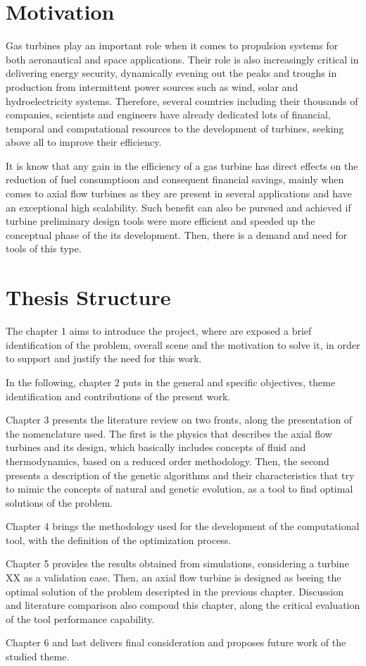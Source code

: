 \section{Motivation}
Gas turbines play an important role when it comes to propulsion systems for both aeronautical and space applications. Their role is also increasingly critical in delivering energy security, dynamically evening out the peaks and troughs in production from intermittent power sources such as wind, solar and hydroelectricity systems. Therefore, several countries including their thousands of companies, scientists and engineers have already dedicated lots of financial, temporal and computational resources to the development of turbines, seeking above all to improve their efficiency.

It is know that any gain in the efficiency of a gas turbine has direct effects on the reduction of fuel consumptioon and consequent financial savings, mainly when comes to axial flow turbines as they are present in several applications and have an exceptional high scalability. Such benefit can also be pursued and achieved if turbine preliminary design tools were more efficient and speeded up the conceptual phase of the its development. Then, there is a demand and need for tools of this type.

\section{Thesis Structure}
The chapter 1 aims to introduce the project, where are exposed a brief identification of the problem, overall scene and the motivation to solve it, in order to support and justify the need for this work.

In the following, chapter 2 puts in the general and specific objectives, theme identification and contributions of the present work.

Chapter 3 presents the literature review on two fronts, along the presentation of the nomenclature used. The first is the physics that describes the axial flow turbines and its design, which basically includes concepts of fluid and thermodynamics, based on a reduced order methodology. Then, the second presents a description of the genetic algorithms and their characteristics that try to mimic the concepts of natural and genetic evolution, as a tool to find optimal solutions of the problem.

Chapter 4 brings the methodology used for the development of the computational tool, with the definition of the optimization process.

Chapter 5 provides the results obtained from simulations, considering a turbine XX as a validation case. Then, an axial flow turbine is designed as beeing the optimal solution of the problem descripted in the previous chapter. Discussion and literature comparison also compoud this chapter, along the critical evaluation of the tool performance capability.

Chapter 6 and last delivers final consideration and proposes future work of the studied theme.
